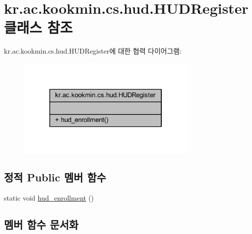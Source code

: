 \hypertarget{classkr_1_1ac_1_1kookmin_1_1cs_1_1hud_1_1_h_u_d_register}{}\section{kr.\+ac.\+kookmin.\+cs.\+hud.\+H\+U\+D\+Register 클래스 참조}
\label{classkr_1_1ac_1_1kookmin_1_1cs_1_1hud_1_1_h_u_d_register}


kr.\+ac.\+kookmin.\+cs.\+hud.\+H\+U\+D\+Register에 대한 협력 다이어그램\+:\nopagebreak
\begin{figure}[H]
\begin{center}
\leavevmode
\includegraphics[width=250pt]{classkr_1_1ac_1_1kookmin_1_1cs_1_1hud_1_1_h_u_d_register__coll__graph}
\end{center}
\end{figure}
\subsection*{정적 Public 멤버 함수}
\begin{DoxyCompactItemize}
\item 
static void \hyperlink{classkr_1_1ac_1_1kookmin_1_1cs_1_1hud_1_1_h_u_d_register_af41fbf131960a0e0e81ef71acb7a3d1e}{hud\+\_\+enrollment} ()
\end{DoxyCompactItemize}


\subsection{멤버 함수 문서화}
\hypertarget{classkr_1_1ac_1_1kookmin_1_1cs_1_1hud_1_1_h_u_d_register_af41fbf131960a0e0e81ef71acb7a3d1e}{}
